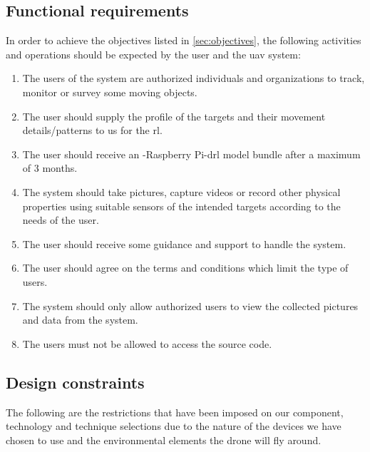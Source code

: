\documentclass[../main.tex]{subfiles}
\begin{document}
\subsection{Functional requirements}

In order to achieve the objectives listed
in \cref{sec:objectives}, the following activities 
and operations should be expected by the user 
and the \gls{uav} system:

\begin{enumerate}
    \item The users of the system are authorized
        individuals and organizations to track, monitor or survey
        some moving objects.
    \item The user should supply the 
        profile of the targets 
        and their movement details/patterns
        to us for the \gls{rl}.
    \item The user should receive 
        an \anafi-Raspberry Pi-\gls{drl} 
        model bundle after a maximum of 3 months.
    \item The system should take pictures, capture videos
        or record other physical properties using
        suitable sensors of the intended
        targets according to the needs
        of the user.
    \item The user should receive some 
        guidance and support 
        to handle the system.
    \item The user should agree on 
        the terms and conditions 
        which limit the type of users.
    \item The system should only allow 
        authorized users 
        to view the collected pictures and 
        data from the \anafi system.
    \item The users must not be allowed to access 
        the source code.
\end{enumerate}

\subsection{Design constraints}

The following are the restrictions that have been imposed
on our component, technology and technique selections 
due to the nature of 
the devices we have chosen to use 
and the environmental elements the drone will 
fly around.
\end{document}
